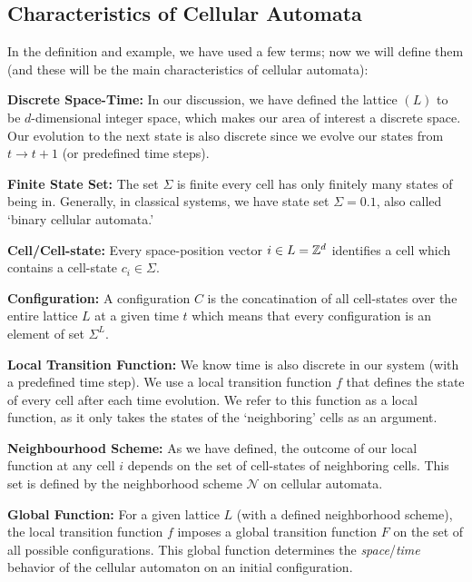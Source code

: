 \documentclass[11pt, oneside, listof=totoc]{scrbook}
\begin{document}
\subsection{Characteristics of Cellular Automata}

In the definition and example, we have used a few terms; now we will define them (and these will be the main characteristics of cellular automata):
\begin{list}{}{}
    \item[\bfseries Discrete Space-Time:] In our discussion, we have defined the lattice \((L)\) to be \(d\)-dimensional integer space, which makes our area of interest a discrete space. Our evolution to the next state is also discrete since we evolve our states from \(t \to t+1\) (or predefined time steps).

    \item[\bfseries Finite State Set:] The set \(\Sigma\) is finite \ie every cell has only finitely many states of being in. Generally, in classical systems, we have state set \(\Sigma = \qty{0, 1}\), also called `binary cellular automata.'

    \item[\bfseries Cell/Cell-state:] Every space-position vector \(i \in L = \mathbb Z^d\) identifies a cell which contains a cell-state \(c_i \in \Sigma\).

    \item[\bfseries Configuration:] A configuration \(C\) is the concatination of all cell-states over the entire lattice \(L\) at a given time \(t\) which means that every configuration is an element of set \(\Sigma^L\).

    \item[\bfseries Local Transition Function:] We know time is also discrete in our system (with a predefined time step). We use a local transition function \(f\) that defines the state of every cell after each time evolution. We refer to this function as a local function, as it only takes the states of the `neighboring' cells as an argument.

    \item[\bfseries Neighbourhood Scheme:] As we have defined, the outcome of our local function at any cell \(i\) depends on the set of cell-states of neighboring cells. This set is defined by the neighborhood scheme \(\mathcal{N}\) on cellular automata.

    \item[\bfseries Global Function:] For a given lattice \(L\) (with a defined neighborhood scheme), the local transition function \(f\) imposes a global transition function \(F\) on the set of all possible configurations. This global function determines the \emph{space}/\emph{time} behavior of the cellular automaton on an initial configuration.
\end{list}
\end{document}
